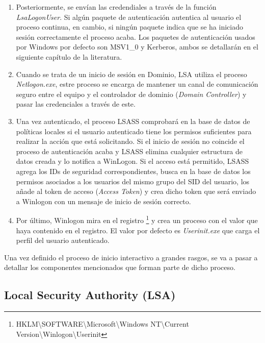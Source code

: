 \begin{enumerate}
\item Posteriormente, se envían las credendiales a través de la función {\it LsaLogonUser}. Si algún paquete de autenticación autentica al usuario el proceso continua, en cambio, si ningún paquete indica que se ha iniciado sesión correctamente el proceso acaba. Los paquetes de autenticación usados por Windows por defecto son MSV1\_0 y Kerberos, ambos se detallarán en el siguiente capítulo de la literatura. 

\item Cuando se trata de un inicio de sesión en Dominio, LSA utiliza el proceso {\it Netlogon.exe}, estre proceso se encarga de mantener un canal de comunicación seguro entre el equipo y el controlador de dominio ({\it Domain Controller}) y pasar las credenciales a través de este. 

\item Una vez autenticado, el proceso LSASS comprobará en la base de datos de políticas locales si el usuario autenticado tiene los permisos suficientes para realizar la acción que está solicitando. Si el inicio de sesión no coincide el proceso de autenticación acaba y LSASS elimina cualquier estructura de datos creada y lo notifica a WinLogon. Si el acceso está permitido, LSASS agrega los IDs de seguridad correspondientes, busca en la base de datos los permisos asociados a los usuarios del mismo grupo del SID del usuario, los añade al token de acceso ({\it Access Token}) y crea dicho token que será enviado a Winlogon con un mensaje de inicio de sesión correcto. 

\item Por último, Winlogon mira en el registro \footnote{HKLM\textbackslash{}SOFTWARE\textbackslash{}Microsoft\textbackslash{}Windows NT\textbackslash{}Current Version\textbackslash{}Winlogon\textbackslash{}Userinit} y crea un proceso con el valor que haya contenido en el registro. El valor por defecto es {\it Userinit.exe} que carga el perfil del usuario autenticado. 

\end{enumerate}

Una vez definido el proceso de inicio interactivo a grandes rasgos, se va a pasar a detallar los componentes mencionados que forman parte de dicho proceso.

\subsection{Local Security Authority (LSA)}

